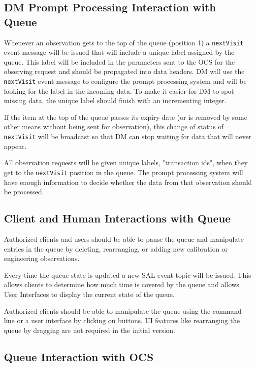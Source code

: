 \documentclass[TS,toc,lsstdraft]{lsstdoc}
\begin{document}
\subsection{DM Prompt Processing Interaction with Queue}

Whenever an observation gets to the top of the queue (position 1) a \texttt{nextVisit} event message will be issued that will include a unique label assigned by the queue.
This label will be included in the parameters sent to the OCS for the observing request and should be propagated into data headers.
DM will use the \texttt{nextVisit} event message to configure the prompt processing system and will be looking for the label in the incoming data.
To make it easier for DM to spot missing data, the unique label should finish with an incrementing integer.

If the item at the top of the queue passes its expiry date (or is removed by some other means without being sent for observation), this change of status of \texttt{nextVisit} will be broadcast so that DM can stop waiting for data that will never appear.

All observation requests will be given unique labels, "transaction ids", when they get to the \texttt{nextVisit} position in the queue.
The prompt processing system will have enough information to decide whether the data from that observation should be processed.

\subsection{Client and Human Interactions with Queue}

Authorized clients and users should be able to pause the queue and manipulate entries in the queue by deleting, rearranging, or adding new calibration or engineering observations.

Every time the queue state is updated a new SAL event topic will be issued.
This allows clients to determine how much time is covered by the queue and allows User Interfaces to display the current state of the queue.

Authorized clients should be able to manipulate the queue using the command line or a user interface by clicking on buttons.
UI features like rearranging the queue by dragging are not required in the initial version.

\subsection{Queue Interaction with OCS}
\end{document}
